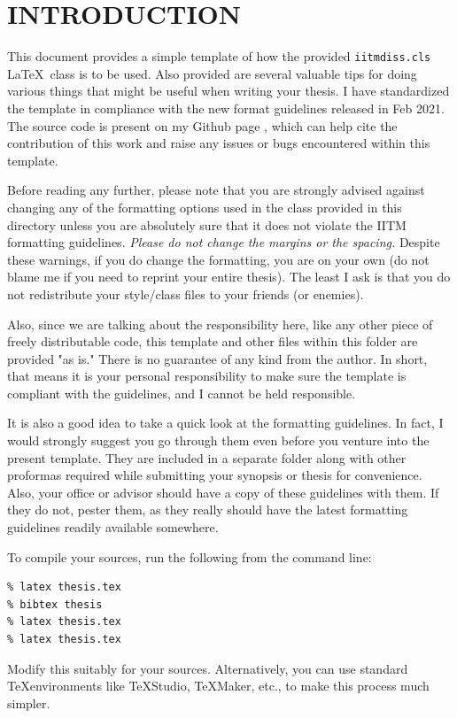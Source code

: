 \chapter{INTRODUCTION}
\label{chap:intro}

This document provides a simple template of how the provided \verb+iitmdiss.cls+ \LaTeX\ class is to be used.  Also provided are several valuable tips for doing various things that might be useful when
writing your thesis. I have standardized the template in compliance with the new format guidelines released in Feb 2021. The source code is present on my Github page \citep{SyedGit2021}, which can help cite the contribution of this work and raise any issues or bugs encountered within this template.

Before reading any further, please note that you are strongly advised against changing any of the formatting options used in the class provided in this directory unless you are absolutely sure that it
does not violate the IITM formatting guidelines.  \emph{Please do not change the margins or the spacing.}   Despite these warnings, if you do change the formatting, you are on your own (do not blame me if you need to reprint your entire
thesis). The least I ask is that you do not redistribute your style/class files to your friends (or enemies). 

Also, since we are talking about the responsibility here, like any other piece of freely distributable code, this template and other files within this folder are provided "as is." There is no guarantee of any kind from the author. In short, that means it is your personal responsibility to make sure the template is compliant with the guidelines, and I cannot be held responsible.

It is also a good idea to take a quick look at the formatting guidelines. In fact, I would strongly suggest you go through them even before you venture into the present template. They are included in a separate folder along with other proformas required while submitting your synopsis or thesis for convenience. Also, your office or advisor should have a copy of these guidelines with them. If they do not, pester them, as they really should have the latest formatting guidelines readily available somewhere. 

To compile your sources, run the following from the command line:
\begin{verbatim}
% latex thesis.tex
% bibtex thesis
% latex thesis.tex
% latex thesis.tex
\end{verbatim}
Modify this suitably for your sources. Alternatively, you can use standard \TeX environments like \TeX Studio, \TeX Maker, etc., to make this process much simpler.

